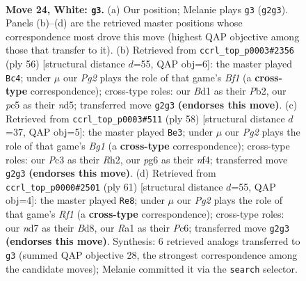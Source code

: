 \documentclass[11pt]{article}
\begin{document}
\clearpage

\begin{figure}[p]\centering
\begin{subfigure}{0.46\textwidth}\centering
\resizebox{\linewidth}{!}{%
\newchessgame
\chessboard[
  setfen={r1b3k1/3n4/1p4p1/2p2p2/2P2P1p/p1P5/P2B2PP/R2B2K1 w - - 4 24},
  showmover=false,
  pgfstyle=straightmove, color=movearrow, markmove={g2-g3}
]}
\caption{}
\end{subfigure}\hfill
\begin{subfigure}{0.46\textwidth}\centering
\resizebox{\linewidth}{!}{%
\newchessgame
\chessboard[
  setfen={r1b5/5k1p/2p3p1/p2n1pB1/8/PR3PP1/1P5P/5BK1 w - - 0 29},
  showmover=false,
  pgfstyle=straightmove, color=movearrow, markmove={f1-c4}
]}
\caption{}
\end{subfigure}
\\[4pt]
\begin{subfigure}{0.46\textwidth}\centering
\resizebox{\linewidth}{!}{%
\newchessgame
\chessboard[
  setfen={5b2/4r2k/2p3p1/p1P1ppPp/P1B2n1P/5P2/1P5R/2K3B1 w - - 3 30},
  showmover=false,
  pgfstyle=straightmove, color=movearrow, markmove={g1-e3}
]}
\caption{}
\end{subfigure}\hfill
\begin{subfigure}{0.46\textwidth}\centering
\resizebox{\linewidth}{!}{%
\newchessgame
\chessboard[
  setfen={3b1rk1/5pp1/2p4p/p1B1Pp2/8/1PP4P/P5P1/4R2K b - - 2 31},
  showmover=false,
  pgfstyle=straightmove, color=movearrow, markmove={f8-e8}
]}
\caption{}
\end{subfigure}
\caption{\textbf{Move 24, White: \texttt{g3}.} (a) Our position; Melanie plays \texttt{g3} (\texttt{g2g3}). Panels (b)--(d) are the retrieved master positions whose correspondence most drove this move (highest QAP objective among those that transfer to it). (b) Retrieved from \texttt{ccrl\_top\_p0003\#2356} (ply 56) [structural distance $d$=55, QAP obj=6]: the master played \texttt{Bc4}; under $\mu$ our \emph{Pg2} plays the role of that game's \emph{Bf1} (a \textbf{cross-type} correspondence); cross-type roles: our \emph{B}d1 as their \emph{P}b2, our \emph{p}c5 as their \emph{n}d5; transferred move \texttt{g2g3} \textbf{(endorses this move)}. (c) Retrieved from \texttt{ccrl\_top\_p0003\#511} (ply 58) [structural distance $d$=37, QAP obj=5]: the master played \texttt{Be3}; under $\mu$ our \emph{Pg2} plays the role of that game's \emph{Bg1} (a \textbf{cross-type} correspondence); cross-type roles: our \emph{P}c3 as their \emph{R}h2, our \emph{p}g6 as their \emph{n}f4; transferred move \texttt{g2g3} \textbf{(endorses this move)}. (d) Retrieved from \texttt{ccrl\_top\_p0000\#2501} (ply 61) [structural distance $d$=55, QAP obj=4]: the master played \texttt{Re8}; under $\mu$ our \emph{Pg2} plays the role of that game's \emph{Rf1} (a \textbf{cross-type} correspondence); cross-type roles: our \emph{n}d7 as their \emph{B}d8, our \emph{R}a1 as their \emph{P}c6; transferred move \texttt{g2g3} \textbf{(endorses this move)}. Synthesis: 6 retrieved analogs transferred to \texttt{g3} (summed QAP objective 28, the strongest correspondence among the candidate moves); Melanie committed it via the \texttt{search} selector.}
\label{fig:thought-m46}
\end{figure}
\end{document}
